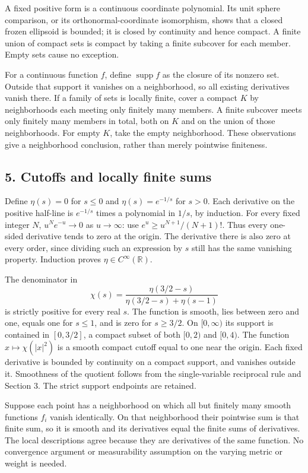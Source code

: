 \documentclass[
  11pt,
]{article}
\begin{document}
A fixed positive form is a continuous coordinate polynomial. Its unit
sphere comparison, or its orthonormal-coordinate isomorphism, shows that
a closed frozen ellipsoid is bounded; it is closed by continuity and
hence compact. A finite union of compact sets is compact by taking a
finite subcover for each member. Empty sets cause no exception.

For a continuous function \(f\), define \(\operatorname{supp}f\) as the
closure of its nonzero set. Outside that support it vanishes on a
neighborhood, so all existing derivatives vanish there. If a family of
sets is locally finite, cover a compact \(K\) by neighborhoods each
meeting only finitely many members. A finite subcover meets only
finitely many members in total, both on \(K\) and on the union of those
neighborhoods. For empty \(K\), take the empty neighborhood. These
observations give a neighborhood conclusion, rather than merely
pointwise finiteness.

\subsection{5. Cutoffs and locally finite
sums}\label{cutoffs-and-locally-finite-sums}

Define \(\eta(s)=0\) for \(s\leq0\) and \(\eta(s)=e^{-1/s}\) for
\(s>0\). Each derivative on the positive half-line is \(e^{-1/s}\) times
a polynomial in \(1/s\), by induction. For every fixed integer \(N\),
\(u^N e^{-u}\to0\) as \(u\to\infty\): use \(e^u\geq u^{N+1}/(N+1)!\).
Thus every one-sided derivative tends to zero at the origin. The
derivative there is also zero at every order, since dividing such an
expression by \(s\) still has the same vanishing property. Induction
proves \(\eta\in C^\infty(\mathbb R)\).

The denominator in \[
\chi(s)=\frac{\eta(3/2-s)}{\eta(3/2-s)+\eta(s-1)}
\] is strictly positive for every real \(s\). The function is smooth,
lies between zero and one, equals one for \(s\leq1\), and is zero for
\(s\geq3/2\). On \([0,\infty)\) its support is contained in \([0,3/2]\),
a compact subset of both \([0,2)\) and \([0,4)\). The function
\(x\mapsto\chi(|x|^2)\) is a smooth compact cutoff equal to one near the
origin. Each fixed derivative is bounded by continuity on a compact
support, and vanishes outside it. Smoothness of the quotient follows
from the single-variable reciprocal rule and Section 3. The strict
support endpoints are retained.

Suppose each point has a neighborhood on which all but finitely many
smooth functions \(f_i\) vanish identically. On that neighborhood their
pointwise sum is that finite sum, so it is smooth and its derivatives
equal the finite sums of derivatives. The local descriptions agree
because they are derivatives of the same function. No convergence
argument or measurability assumption on the varying metric or weight is
needed.
\end{document}
